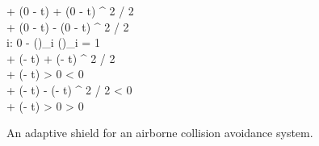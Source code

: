 \begin{figure}
\begin{center}
\begin{sllisting}
      \slind \cahzerointmin \slassign \cahintmax + \cavintmin \cdot (0 - t) + \caAint \cdot (0 - t) ^ 2 / 2 \seq \\
      \slind \cahzerointmax \slassign \cahintmin + \cavintmax \cdot (0 - t) - \caAint \cdot (0 - t) ^ 2 / 2 \seq \\
      \slind \cacmin \slassign \slaggregate i: 0  - (\caEtaThree)_i  \slwhen (\caOmegaThree)_i = 1 \seq \\
      \slind \cahmintmax \slassign \cahintmax + \cavintmax \cdot (\catm - t) + \caAint \cdot (\catm - t) ^ 2 / 2 \slwhen \cacmin {} \land \cahzerointmax {} \seq \\
      \slind \cahmintmax \slassign \cahintmax + \cavintmax \cdot (\catm - t) \slwhen \cacmin > 0 \wedge \cahzerointmax < 0 \seq \\
      \slind \cahmintmin \slassign \cahintmin + \cavintmin \cdot (\catm - t) - \caAint \cdot (\catm - t) ^ 2 / 2 \slwhen \cacmin {} \land \cahzerointmin < 0 \seq \\
      \slind \cahmintmin \slassign \cahintmin + \cavintmin \cdot (\catm - t) \slwhen \cacmin > 0 \wedge \cahzerointmin > 0
  \end{sllisting}
  \end{center}
  \caption{An adaptive shield for an airborne collision avoidance system.}\label{fig:acas}
  \Description[]{}
\end{figure}
